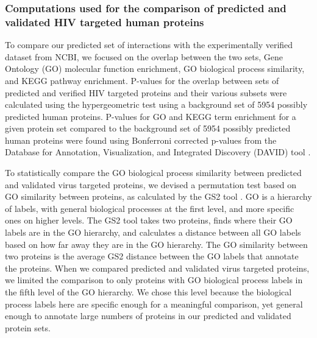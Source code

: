 
\subsubsection{Computations used for the comparison of predicted and validated HIV targeted human proteins}

To compare our predicted set of interactions with the experimentally
verified dataset from NCBI, we focused on the overlap between the two
sets, Gene Ontology (GO) \cite{ashburner00} molecular function
enrichment, GO biological process similarity, and KEGG pathway
\cite{kanehisa08} enrichment. P-values for the overlap between sets of
predicted and verified HIV targeted proteins and their various subsets
were calculated using the hypergeometric test using a background set
of 5954 possibly predicted human proteins. P-values for GO and KEGG
term enrichment for a given protein set compared to the background set
of 5954 possibly predicted human proteins were found using Bonferroni
corrected p-values from the Database for Annotation, Visualization,
and Integrated Discovery (DAVID) tool \cite{dennis03}.

To statistically compare the GO biological process similarity between
predicted and validated virus targeted proteins, we devised a
permutation test based on GO similarity between proteins, as
calculated by the GS2 tool \cite{ruths2009gs}. GO is a hierarchy of
labels, with general biological processes at the first level, and more
specific ones on higher levels. The GS2 tool takes two proteins, finds
where their GO labels are in the GO hierarchy, and calculates a
distance between all GO labels based on how far away they are in the
GO hierarchy. The GO similarity between two proteins is the average
GS2 distance between the GO labels that annotate the proteins. When we
compared predicted and validated virus targeted proteins, we limited
the comparison to only proteins with GO biological process labels in
the fifth level of the GO hierarchy. We chose this level because the
biological process labels here are specific enough for a meaningful
comparison, yet general enough to annotate large numbers of proteins
in our predicted and validated protein sets.

